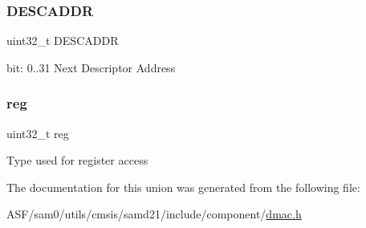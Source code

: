 \subsubsection{\texorpdfstring{DESCADDR}{DESCADDR}}
{\footnotesize\ttfamily uint32\+\_\+t D\+E\+S\+C\+A\+D\+DR}

bit\+: 0..31 Next Descriptor Address \mbox{\label{union_d_m_a_c___d_e_s_c_a_d_d_r___type_a6b91636401516a477989a336376d7b40}} 
\subsubsection{\texorpdfstring{reg}{reg}}
{\footnotesize\ttfamily uint32\+\_\+t reg}

Type used for register access 

The documentation for this union was generated from the following file\+:\begin{DoxyCompactItemize}
\item 
A\+S\+F/sam0/utils/cmsis/samd21/include/component/\mbox{\hyperlink{component_2dmac_8h}{dmac.\+h}}\end{DoxyCompactItemize}
